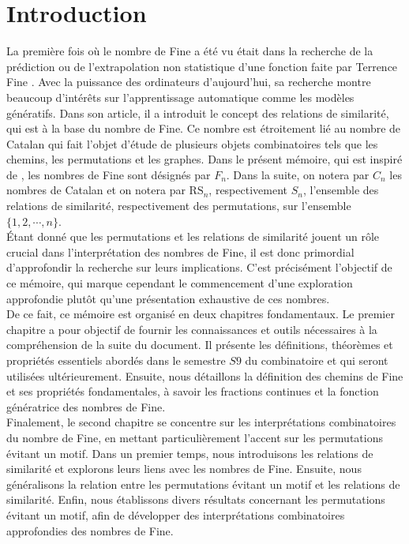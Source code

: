 \section*{Introduction}
\vspace*{20pt}
La première fois où le nombre de Fine a été vu était dans la recherche de la prédiction ou de l'extrapolation non statistique d'une fonction faite par Terrence Fine \cite{TFine}. Avec la puissance des ordinateurs d'aujourd'hui, sa recherche montre beaucoup d'intérêts sur l'apprentissage automatique comme les modèles génératifs. Dans son article, il a introduit le concept des relations de similarité, qui est à la base du nombre de Fine.
Ce nombre est étroitement lié au nombre de Catalan qui fait l'objet d'étude de plusieurs objets combinatoires tels que les chemins, les permutations et les graphes. Dans le présent mémoire, qui est inspiré de \cite{RRP}, les nombres de Fine sont désignés par $F_{n}$. Dans la suite, on notera par $C_{n}$ les nombres de Catalan et on notera par $\text{RS}_{n}$, respectivement $S_{n}$, l'ensemble des relations de similarité, respectivement des permutations, sur l'ensemble $\{1, 2, \cdots, n\}$.\vspace{5pt}\\

Étant donné que les permutations et les relations de similarité jouent un rôle crucial dans l'interprétation des nombres de Fine, il est donc primordial d'approfondir la recherche sur leurs implications. C'est précisément l'objectif de ce mémoire, qui marque cependant le commencement d'une exploration approfondie plutôt qu'une présentation exhaustive de ces nombres. \vspace{5pt}\\

De ce fait, ce mémoire est organisé en deux chapitres fondamentaux. Le premier chapitre a pour objectif de fournir les connaissances et outils nécessaires à la compréhension de la suite du document. Il présente les définitions, théorèmes et propriétés essentiels abordés dans le semestre $S9$ du combinatoire et qui seront utilisées ultérieurement. Ensuite, nous détaillons la définition des chemins de Fine et ses propriétés fondamentales, à savoir les fractions continues et la fonction génératrice des nombres de Fine. \vspace*{5pt}\\

Finalement, le second chapitre se concentre sur les interprétations combinatoires du nombre de Fine, en mettant particulièrement l'accent sur les permutations évitant un motif. Dans un premier temps, nous introduisons les relations de similarité et explorons leurs liens avec les nombres de Fine. Ensuite, nous généralisons la relation entre les permutations évitant un motif et les relations de similarité. Enfin, nous établissons divers résultats concernant les permutations évitant un motif, afin de développer des interprétations combinatoires approfondies des nombres de Fine.\\
\newpage

